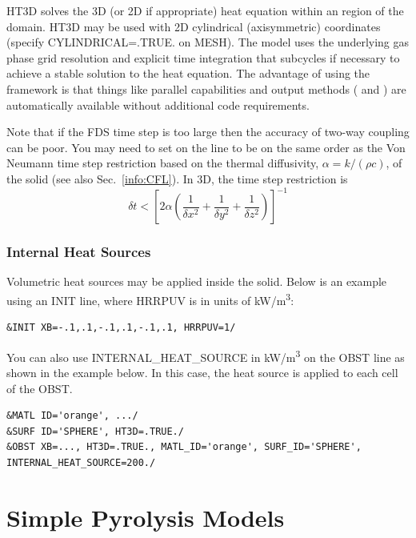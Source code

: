 \documentclass[11pt]{book}
\begin{document}
{\ct HT3D} solves the 3D (or 2D if appropriate) heat equation within an {} region of the domain.  {\ct HT3D} may be used with 2D cylindrical (axisymmetric) coordinates (specify {\ct CYLINDRICAL=.TRUE.} on {\ct MESH}).  The model uses the underlying gas phase grid resolution and explicit time integration that subcycles if necessary to achieve a stable solution to the heat equation.  The advantage of using the {} framework is that things like parallel capabilities and output methods ({} and {}) are automatically available without additional code requirements.

  Note that if the FDS time step is too large then the accuracy of two-way coupling can be poor.  You may need to set {} on the {} line to be on the same order as the Von Neumann time step restriction based on the thermal diffusivity, $\alpha = k/(\rho c)$, of the solid (see also Sec.~\ref{info:CFL}).  In 3D, the time step restriction is
\begin{equation}
\label{eq:vnht3d}
\delta t < \left[ 2 \alpha \left( \frac{1}{\delta x^2} + \frac{1}{\delta y^2} + \frac{1}{\delta z^2} \right) \right]^{-1}
\end{equation}

\subsubsection{Internal Heat Sources}

Volumetric heat sources may be applied inside the solid.  Below is an example using an {\ct INIT} line, where {\ct HRRPUV} is in units of \si{kW/m^3}:
\begin{lstlisting}
&INIT XB=-.1,.1,-.1,.1,-.1,.1, HRRPUV=1/
\end{lstlisting}

You can also use {\ct INTERNAL\_HEAT\_SOURCE} in \si{kW/m^3} on the {\ct OBST} line as shown in the example below.  In this case, the heat source is applied to each cell of the {\ct OBST}.
\begin{lstlisting}
&MATL ID='orange', .../
&SURF ID='SPHERE', HT3D=.TRUE./
&OBST XB=..., HT3D=.TRUE., MATL_ID='orange', SURF_ID='SPHERE', INTERNAL_HEAT_SOURCE=200./
\end{lstlisting}





\section{Simple Pyrolysis Models}
\end{document}
